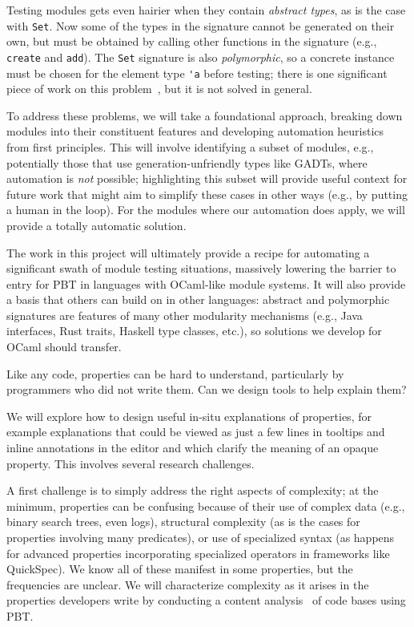 Testing modules gets even hairier when they contain {\em abstract types}, as is
the case with \lstinline{Set}. Now some of the types in the signature cannot be
generated on their own, but must be obtained by
calling other functions in the signature (e.g., \lstinline{create} and \lstinline{add}). The \lstinline{Set} signature is
also {\em polymorphic}, so a concrete instance must be chosen for
the element type \lstinline{'a} before
testing; there is one significant piece of work on this
problem~\cite{hou_favonia_logarithm_2022}, but it is not solved in general.

To address these problems, we will take a foundational approach, breaking down
modules into their constituent features and developing automation
heuristics from first
principles. This will involve identifying a subset of modules, e.g., potentially
those that use generation-unfriendly types like GADTs, where automation is {\em
not} possible; highlighting this subset will provide useful context for future
work that might aim to simplify these cases in other ways (e.g., by putting a
human in the loop). For the modules where our automation does apply, we will
provide a totally automatic solution.

The work in this project will ultimately provide a recipe for automating a
significant swath of module testing situations, massively lowering the
barrier to entry
for PBT in languages with OCaml-like module
systems. It will also
provide a basis that others can
build on in other languages: abstract and polymorphic signatures are features of
many other modularity mechanisms (e.g., Java interfaces, Rust traits, Haskell
type classes, etc.), so solutions we develop for OCaml should
transfer.


Like any code, properties can
be hard to understand, particularly by programmers who did not write
them. Can we design
tools to help explain them?

We will explore how to design useful in-situ explanations of properties, for example
explanations that could be viewed as just a few lines in
tooltips and inline annotations in the editor and which clarify the meaning
of an opaque property. This involves
several research challenges.

A first challenge is to simply address the right
aspects of complexity; at the minimum, properties can
be confusing because of their use of complex data (e.g., binary search trees,
even logs), structural complexity (as is the cases for properties involving many
predicates), or use of specialized syntax (as happens for advanced properties
incorporating specialized operators in frameworks like QuickSpec). We know all
of these manifest in some properties, but the frequencies are unclear.
We will characterize complexity as it arises
in the properties developers write by conducting a content
analysis~\cite{ref:krippendorff2018content} of code bases using PBT.

